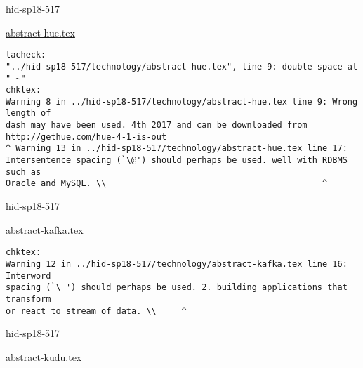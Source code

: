 

\begin{IU}

hid-sp18-517

\href{https://github.com/cloudmesh-community/hid-sp18-517/blob/master//technology/abstract-hue.tex}{abstract-hue.tex}

\begin{tiny}
\begin{verbatim}
lacheck:
"../hid-sp18-517/technology/abstract-hue.tex", line 9: double space at " ~"
chktex:
Warning 8 in ../hid-sp18-517/technology/abstract-hue.tex line 9: Wrong length of
dash may have been used. 4th 2017 and can be downloaded from
http://gethue.com/hue-4-1-is-out
^ Warning 13 in ../hid-sp18-517/technology/abstract-hue.tex line 17:
Intersentence spacing (`\@') should perhaps be used. well with RDBMS such as
Oracle and MySQL. \\                                           ^
\end{verbatim}
\end{tiny}
\end{IU}



\begin{IU}

hid-sp18-517

\href{https://github.com/cloudmesh-community/hid-sp18-517/blob/master//technology/abstract-kafka.tex}{abstract-kafka.tex}

\begin{tiny}
\begin{verbatim}
chktex:
Warning 12 in ../hid-sp18-517/technology/abstract-kafka.tex line 16: Interword
spacing (`\ ') should perhaps be used. 2. building applications that transform
or react to stream of data. \\     ^
\end{verbatim}
\end{tiny}
\end{IU}



\begin{IU}

hid-sp18-517

\href{https://github.com/cloudmesh-community/hid-sp18-517/blob/master//technology/abstract-kudu.tex}{abstract-kudu.tex}

\begin{tiny}
\begin{verbatim}
\end{verbatim}
\end{tiny}
\end{IU}

